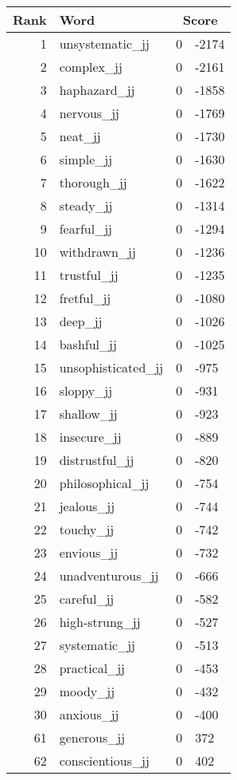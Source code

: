 \begin{longtable}[!htbp]{| rlr@{.}l |}
    \hline
    \textbf{Rank} & \textbf{Word} & \multicolumn{2}{c|}{\textbf{Score}} \\
    \hline
    \endhead
    1 & unsystematic\_jj & 0 & -2174 \\
    2 & complex\_jj & 0 & -2161 \\
    3 & haphazard\_jj & 0 & -1858 \\
    4 & nervous\_jj & 0 & -1769 \\
    5 & neat\_jj & 0 & -1730 \\
    6 & simple\_jj & 0 & -1630 \\
    7 & thorough\_jj & 0 & -1622 \\
    8 & steady\_jj & 0 & -1314 \\
    9 & fearful\_jj & 0 & -1294 \\
    10 & withdrawn\_jj & 0 & -1236 \\
    11 & trustful\_jj & 0 & -1235 \\
    12 & fretful\_jj & 0 & -1080 \\
    13 & deep\_jj & 0 & -1026 \\
    14 & bashful\_jj & 0 & -1025 \\
    15 & unsophisticated\_jj & 0 & -975 \\
    16 & sloppy\_jj & 0 & -931 \\
    17 & shallow\_jj & 0 & -923 \\
    18 & insecure\_jj & 0 & -889 \\
    19 & distrustful\_jj & 0 & -820 \\
    20 & philosophical\_jj & 0 & -754 \\
    21 & jealous\_jj & 0 & -744 \\
    22 & touchy\_jj & 0 & -742 \\
    23 & envious\_jj & 0 & -732 \\
    24 & unadventurous\_jj & 0 & -666 \\
    25 & careful\_jj & 0 & -582 \\
    26 & high-strung\_jj & 0 & -527 \\
    27 & systematic\_jj & 0 & -513 \\
    28 & practical\_jj & 0 & -453 \\
    29 & moody\_jj & 0 & -432 \\
    30 & anxious\_jj & 0 & -400 \\
    61 & generous\_jj & 0 & 372 \\
    62 & conscientious\_jj & 0 & 402 \\

\end{longtable}
